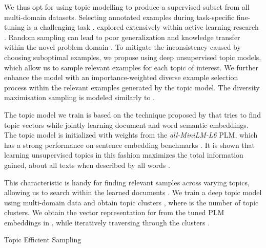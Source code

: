 \documentclass[11pt]{article}
\begin{document}
We thus opt for using topic modelling to produce a supervised subset from all multi-domain datasets. Selecting annotated examples during task-specific fine-tuning is a challenging task \cite{shao2019learning}, explored extensively within active learning research \cite{hino2020active, konyushkova2017learning}. Random sampling can lead to poor generalization and knowledge transfer within the novel problem domain \cite{das2021importance, perez2021true}. To mitigate the inconsistency caused by choosing suboptimal examples, we propose using deep unsupervised topic models, which allow us to sample relevant examples for each topic of interest. We further enhance the model with an importance-weighted diverse example selection process \cite{shao2019learning,yang2015multi} within the relevant examples generated by the topic model. The diversity maximisation sampling is modeled similarly to \citet{yang2015multi}.

The topic model we train is based on the technique proposed by \citet{angelov2020top2vec} that tries to find topic vectors while jointly learning document and word semantic embeddings. The topic model is initialized with weights from the \textit{all-MiniLM-L6} PLM, which has a strong performance on sentence embedding benchmarks \citep{wang2020minilm}. It is shown that learning unsupervised topics in this fashion maximizes the total information gained, about all texts  when described by all words .




This characteristic is handy for finding relevant samples across varying topics, allowing us to search within the learned documents . We train a deep topic model  using multi-domain data  and obtain topic clusters , where  is the number of topic clusters. We obtain the vector representation for  from the tuned PLM embeddings  in , while iteratively traversing through the clusters .


\begin{algorithm}
\caption{Topic Efficient Sampling}\label{algo:sampling}
\begin{algorithmic}
\Require  {} 
\Require 
\Ensure 
\State 
\State  {}
\For{} 
\State 
\State  {}
\State 
\State  {}
\While{}
\State  {}
\State 
{}
\State 
\State 
\State \resizebox{0.8\hsize}{!}{}

\State {}

\EndWhile{}
\EndFor{}\\
\Return 
\end{algorithmic}
\end{algorithm}
\end{document}
